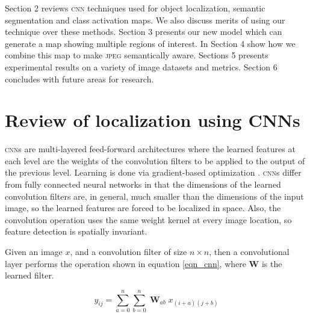 Section 2 reviews \textsc{cnn} techniques used for object localization, semantic segmentation and class activation maps. We also discuss merits of using our technique over these methods.
Section 3 presents our new model which can generate a map showing multiple regions of interest. In Section 4 show how we combine this map to make \textsc{jpeg} semantically aware.
Sections 5 presents experimental results on a variety of image datasets and metrics. Section 6 concludes with future areas for research.


\section{Review of localization using CNNs}

\textsc{cnn}s are multi-layered feed-forward architectures where the learned features at each level are the weights of the convolution filters to be applied to the output of the previous level. Learning is done via gradient-based optimization \cite{xxx_lecun1995convolutional}.
\textsc{cnn}s differ from fully connected neural networks in that the dimensions of the learned convolution filters are, in general, much smaller than the dimensions of the input image, so the learned features are forced to be localized in space. Also, the convolution operation uses the same weight kernel at every image location, so feature detection is spatially invariant.


Given an image $x$, and a convolution filter of size $n \times n$, then a convolutional layer performs the operation shown in equation \ref{eqn_cnn}, where $\mathbf{W}$ is the learned filter.

\begin{equation}
    y_{ij} = \sum_{a=0}^{n} \sum_{b=0}^{n} \; \mathbf{W}_{ab} \; x_{(i+a)(j+b)}
    \label{eqn_cnn}
\end{equation}

